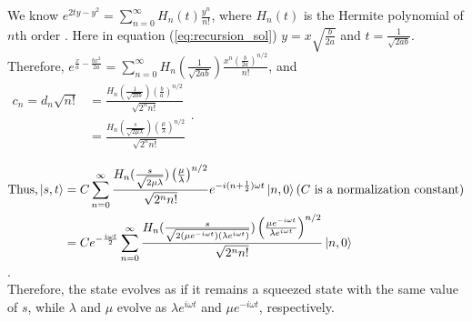 \documentclass[12pt, twoside]{article}
\begin{document}
We know $e^{2ty -y^2} = \sum _ { n = 0 } ^ { \infty } H _ { n } ( t ) \frac { y ^ { n } } { n ! }$, where $H_n(t)$ is the Hermite polynomial of $n$th order \cite{arfken_weber_harris}. Here in equation (\ref{eq:recursion_sol}) $y = x \sqrt{\frac{b}{2a}}$ and $t = \frac{1}{\sqrt{2ab}}$. \\ Therefore, $e^{\frac{x}{a} - \frac{bx^2}{2a}} = \sum _ { n = 0 } ^ { \infty } H _ { n }( \frac{1}{\sqrt { 2 a b } }) \frac {x ^ { n } \left( \frac { b } { 2 a } \right) ^ { n / 2 } } { n ! }$, and \\$\begin{aligned}c_n = d_n \sqrt{n!} &= \frac{ H_n ( \frac { 1 } { \sqrt { 2 a b } }) \left( \frac { b } { a } \right) ^ { n / 2 }}{\sqrt{2^n n!}}\\ &=\frac{ H_n ( \frac { s } { \sqrt { 2 \mu \lambda } }) \left( \frac { \mu } { \lambda } \right) ^ { n / 2 }}{\sqrt{2^n n!}}\end{aligned}$.

$\begin{aligned}\text{Thus,}\ket{s,t} &= C \sum _ { n = 0 } ^ { \infty } \frac{ H_n ( \frac { s } { \sqrt { 2 \mu \lambda } }) \left( \frac { \mu } { \lambda } \right) ^ { n / 2 }}{\sqrt{2^n n!}} e^{-i(n+\frac{1}{2})\omega t}\ket{n,0} (C \text{ is a normalization constant}) \\ &= C e^{-\frac{i\omega t}{2}}\sum _ { n = 0 } ^ { \infty } \frac{ H_n ( \frac { s } { \sqrt { 2 (\mu e^{-i\omega t}) (\lambda e^{i\omega t}) } }) \left( \frac { \mu e^{-i\omega t}} { \lambda e^{i\omega t} } \right) ^ { n / 2 }}{\sqrt{2^n n!}}\ket{n,0} \end{aligned}$.\\ Therefore, the state evolves as if it remains a squeezed state with the same value of $s$, while $\lambda$ and $\mu$ evolve as $ \lambda e^{i\omega t}$ and $\mu e^{-i\omega t}$, respectively.
\end{document}
